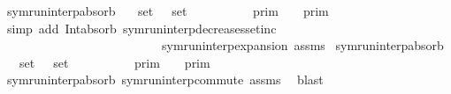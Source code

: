 \begin{isabellebody}
%
\endisatagproof
{\isafoldproof}%
%
\isadelimproof
\isanewline
%
\endisadelimproof
\isanewline
{}\isamarkupfalse%
\ symrun{\isacharunderscore}interp{\isacharunderscore}absorb{}{\isacharcolon}\isanewline
\ \ \ {\isacartoucheopen}set\ {\isasymGamma}\ {\isasymsubseteq}\ set\ {\isasymGamma}\isanewline
\ \ \ \ \ {\isacartoucheopen}{\isasymlbrakk}{\isasymlbrakk}\ {\isasymGamma}\ {\isacharat}\ {\isasymGamma}\ {\isasymrbrakk}{\isasymrbrakk}\isactrlsub p\isactrlsub r\isactrlsub i\isactrlsub m\ {\isacharequal}\ {\isasymlbrakk}{\isasymlbrakk}\ {\isasymGamma}\ {\isasymrbrakk}{\isasymrbrakk}\isactrlsub p\isactrlsub r\isactrlsub i\isactrlsub m{\isacartoucheclose}\isanewline
%
\isadelimproof
%
\endisadelimproof
%
\isatagproof
{}\isamarkupfalse%
\ {\isacharparenleft}simp\ add{\isacharcolon}\ Int{\isacharunderscore}absorb{}\ symrun{\isacharunderscore}interp{\isacharunderscore}decreases{\isacharunderscore}setinc\isanewline
\ \ \ \ \ \ \ \ \ \ \ \ \ \ \ \ \ \ \ \ \ \ \ \ \ \ symrun{\isacharunderscore}interp{\isacharunderscore}expansion\ assms{\isacharparenright}%
\endisatagproof
{\isafoldproof}%
%
\isadelimproof
\isanewline
%
\endisadelimproof
\isanewline
{}\isamarkupfalse%
\ symrun{\isacharunderscore}interp{\isacharunderscore}absorb{}{\isacharcolon}\isanewline
\ \ \ {\isacartoucheopen}set\ {\isasymGamma}\ {\isasymsubseteq}\ set\ {\isasymGamma}\isanewline
\ \ \ \ \ {\isacartoucheopen}{\isasymlbrakk}{\isasymlbrakk}\ {\isasymGamma}\ {\isacharat}\ {\isasymGamma}\ {\isasymrbrakk}{\isasymrbrakk}\isactrlsub p\isactrlsub r\isactrlsub i\isactrlsub m\ {\isacharequal}\ {\isasymlbrakk}{\isasymlbrakk}\ {\isasymGamma}\ {\isasymrbrakk}{\isasymrbrakk}\isactrlsub p\isactrlsub r\isactrlsub i\isactrlsub m{\isacartoucheclose}\isanewline
%
\isadelimproof
%
\endisadelimproof
%
\isatagproof
{}\isamarkupfalse%
\ symrun{\isacharunderscore}interp{\isacharunderscore}absorb{}\ symrun{\isacharunderscore}interp{\isacharunderscore}commute\ assms\ \isamarkupfalse%
\ blast%
\endisatagproof
{\isafoldproof}%
%
\isadelimproof
\isanewline
%
\endisadelimproof
%
\isadelimtheory
\isanewline
%
\endisadelimtheory
%
\isatagtheory
{}\isamarkupfalse%
%
\endisatagtheory
{\isafoldtheory}%
%
\isadelimtheory
%
\endisadelimtheory
%
\end{isabellebody}%
